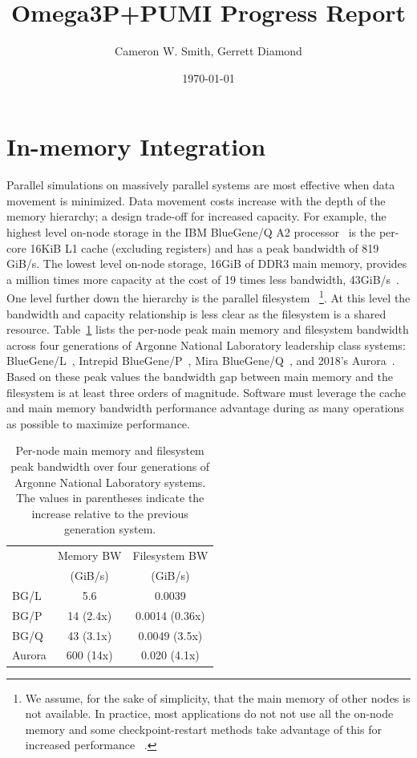 \documentclass[a4paper]{article}
\title{Omega3P+PUMI Progress Report}
\author{Cameron W. Smith, Gerrett Diamond}
\date{\today}
\begin{document}
\maketitle

\section{In-memory Integration}

Parallel simulations on massively parallel systems are most effective when data
movement is minimized.
Data movement costs increase with the depth of the memory hierarchy; a design
trade-off for increased capacity.
For example, the highest level on-node storage in the IBM BlueGene/Q A2
processor~\cite{haring2012ibm} is the per-core 16KiB L1 cache (excluding
registers) and has a peak bandwidth of 819 GiB/s.
The lowest level on-node storage, 16GiB of DDR3 main memory, provides a million
times more capacity at the cost of 19 times less bandwidth,
43GiB/s~\cite{lo2014roofline}.
One level further down the hierarchy is the parallel filesystem
~\footnote{We assume, for the sake of simplicity, that the main memory of other nodes is not
available.
In practice, most applications do not not use all the on-node memory and some
checkpoint-restart methods take advantage of this for increased performance
~\cite{rma-fault-tolerance-2014,isaila2014making,compression-cr-2012}.
}.
At this level the bandwidth and capacity relationship is less clear as the
filesystem is a shared resource.
Table~\ref{tbl:systems} lists the per-node peak main memory and filesystem
bandwidth across four generations of Argonne National Laboratory leadership
class systems: BlueGene/L~\cite{yu2006high,adiga2002overview}, Intrepid
BlueGene/P~\cite{lang2009performance,alam2008early}, Mira
BlueGene/Q~\cite{haring2012ibm,bui2014scalable}, and 2018's
Aurora~\cite{aurorafacts}.
Based on these peak values the bandwidth gap between main memory and the
filesystem is at least three orders of magnitude.
Software must leverage the cache and main memory bandwidth performance advantage
during as many operations as possible to maximize performance.

\begin{table}[h]
\centering
\caption{Per-node main memory and filesystem peak bandwidth over four
  generations of Argonne National Laboratory systems.
  The values in parentheses indicate the increase relative to
  the previous generation system.}
\label{tbl:systems}
\begin{tabular}{l|cc}
        & Memory BW & Filesystem BW \\
        & (GiB/s)    & (GiB/s)    \\
 \hline
 BG/L   & 5.6       & 0.0039         \\
 BG/P   & 14 (2.4x) & 0.0014 (0.36x)   \\
 BG/Q   & 43 (3.1x) & 0.0049 (3.5x) \\
 Aurora & 600 (14x) & 0.020 (4.1x)
\end{tabular}
\end{table}
\end{document}
